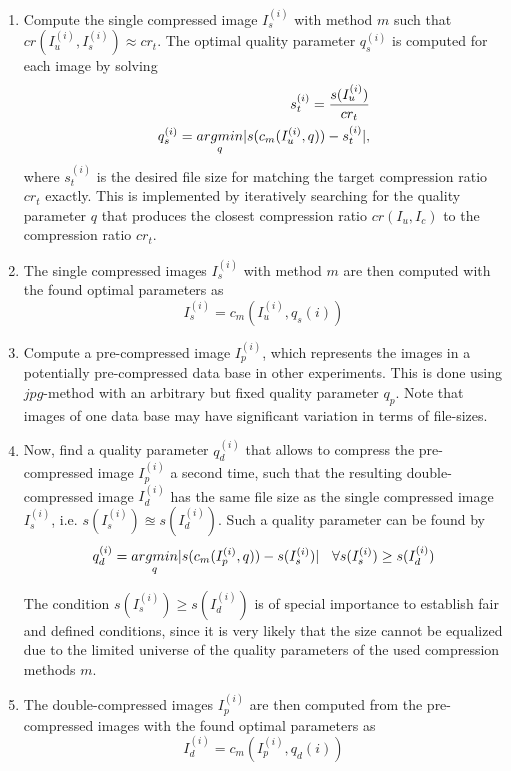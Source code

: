 \documentclass[10pt,twocolumn,letterpaper]{article}
\begin{document}
\begin{enumerate}
	\item Compute the single compressed image $I_s^{(i)}$ with method $m$ such that $cr(I_u^{(i)}, I_s^{(i)}) \approx cr_t$. The optimal quality parameter $q_s^{(i)}$ is computed for each image by solving
	\begin{eqnarray}
	\small
	s_t^{(i)} = \frac{s(I_u^{(i)})}{cr_t} \\
		q_s^{(i)} = \underset{q}{argmin}|s(c_m(I_u^{(i)},q)) - s_t^{(i)}|,
	\end{eqnarray} where $s_t^{(i)}$ is the desired file size for matching the target compression ratio $cr_t$ exactly. This is implemented by iteratively searching for the quality parameter $q$ that produces the closest compression ratio $cr(I_u, I_c)$ to the compression ratio $cr_t$. 
	\item The single compressed images $I_s^{(i)}$ with method $m$ are then computed with the found optimal parameters as
	\begin{equation}
	I_s^{(i)} = c_m(I_u^{(i)}, q_s{(i)})
	\end{equation}
	
	\item Compute a pre-compressed image $I_p^{(i)}$, which represents the images in a potentially pre-compressed data base in other experiments. This is done using $jpg$-method \cite{jpg} with an arbitrary but fixed quality parameter $q_p$. Note that images of one data base may have significant variation in terms of file-sizes.
	
	\item Now, find a quality parameter $q_d^{(i)}$ that allows to compress the pre-compressed image $I_p^{(i)}$ a second time, such that the resulting double-compressed image $I_d^{(i)}$ has the same file size as the single compressed image $I_s^{(i)}$, i.e. $s(I_s^{(i)}) \approxeq s(I_d^{(i)})$. Such a quality parameter can be found by 
	\begin{equation}
	\small
		q_d^{(i)} = \underset{q}{argmin}|s(c_m(I_p^{(i)},q)) - s(I_s^{(i)})| \quad \forall s(I_s^{(i)}) \geq s(I_d^{(i)})
	\end{equation}
	
	The condition $s(I_s^{(i)}) \geq s(I_d^{(i)})$ is of special importance to establish fair and defined conditions, since it is very likely that the size cannot be equalized due to the limited universe of the quality parameters of the used compression methods $m$.
	
	\item The double-compressed images $I_p^{(i)}$ are then computed from the pre-compressed images with the found optimal parameters as
	\begin{equation}
		I_d^{(i)} = c_m(I_p^{(i)}, q_d{(i)})
	\end{equation}
	
\end{enumerate}
\end{document}
